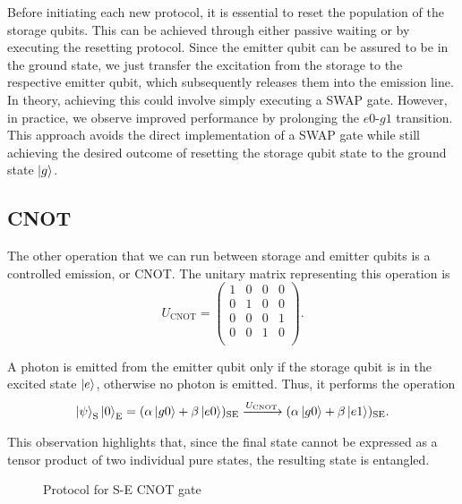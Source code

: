 Before initiating each new protocol, it is essential to reset the population of the storage qubits.
This can be achieved through either passive waiting or by executing the resetting protocol.
Since the emitter qubit can be assured to be in the ground state, we just transfer the excitation from the storage to the respective emitter qubit, which subsequently releases them into the emission line.
In theory, achieving this could involve simply executing a SWAP gate.
However, in practice, we observe improved performance by prolonging the $e0$-$g1$ transition.
This approach avoids the direct implementation of a SWAP gate while still achieving the desired outcome of resetting the storage qubit state to the ground state $\ket{g}$.

\subsection{CNOT}

The other operation that we can run between storage and emitter qubits is a controlled emission, or CNOT.
The unitary matrix representing this operation is
\begin{equation}
    U_{\text{CNOT}} = 
    \begin{pmatrix}
    1 & 0 & 0 & 0 \\
    0 & 1 & 0 & 0 \\
    0 & 0 & 0 & 1 \\
    0 & 0 & 1 & 0 \\
\end{pmatrix}.
\end{equation}

A photon is emitted from the emitter qubit only if the storage qubit is in the excited state $\ket{e}$, otherwise no photon is emitted.
Thus, it performs the operation
\begin{equation}
    \ket{\psi}_{\text{S}} \ket{0}_{\text{E}} = 
    (\alpha \ket{g0} + \beta \ket{e0})_{\text{SE}} \xrightarrow{U_{\text{CNOT}}}
    (\alpha \ket{g0} + \beta \ket{e1})_{\text{SE}} .
\end{equation}

This observation highlights that, since the final state cannot be expressed as a tensor product of two individual pure states, the resulting state is entangled.

\begin{figure}
    \centering
    
    \vspace{-1cm}
    \caption{Protocol for S-E CNOT gate}
    \label{fig:SE_CNOT}
\end{figure}


